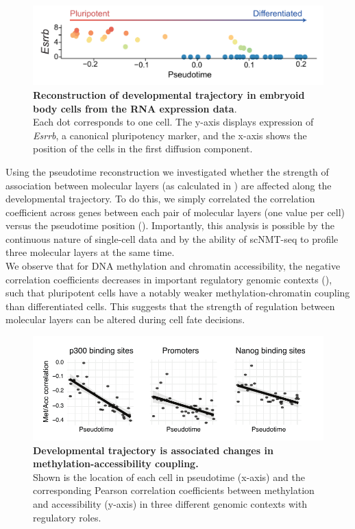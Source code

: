 \begin{figure}[H]
	\centering
	\includegraphics[width=0.85\linewidth]{scNMT_pseudotime}
	\caption[]{\textbf{Reconstruction of developmental trajectory in embryoid body cells from the RNA expression data}.\\
	Each dot corresponds to one cell. The y-axis displays expression of \textit{Esrrb}, a canonical pluripotency marker, and the x-axis shows the position of the cells in the first diffusion component.}
	\label{fig:scnmt_pseudotime}
\end{figure}


Using the pseudotime reconstruction we investigated whether the strength of association between molecular layers (as calculated in ) are affected along the developmental trajectory. To do this, we simply correlated the correlation coefficient across genes between each pair of molecular layers (one value per cell) versus the pseudotime position (). Importantly, this analysis is possible by the continuous nature of single-cell data and by the ability of scNMT-seq to profile three molecular layers at the same time.\\
We observe that for DNA methylation and chromatin accessibility, the negative correlation coefficients decreases in important regulatory genomic contexts (), such that pluripotent cells have a notably weaker methylation-chromatin coupling than differentiated cells. This suggests that the strength of regulation between molecular layers can be altered during cell fate decisions.

\begin{figure}[H]
	\centering
	\includegraphics[width=0.9\linewidth]{scNMT_pseudotime_coupling}
	\caption[]{\textbf{Developmental trajectory is associated changes in methylation-accessibility coupling.}\\
	Shown is the location of each cell in pseudotime (x-axis) and the corresponding Pearson correlation coefficients between methylation and accessibility (y-axis) in three different genomic contexts with regulatory roles.
	}
	\label{fig:scnmt_pseudotime_coupling}
\end{figure}

